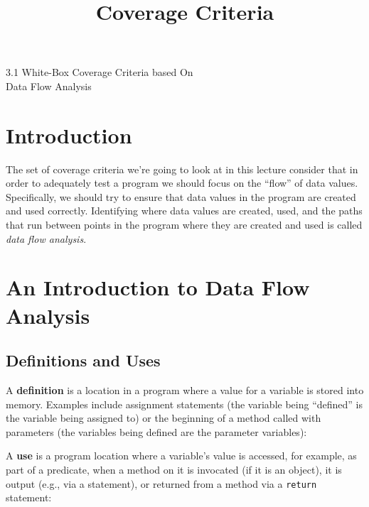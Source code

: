 



\title{Coverage Criteria}{3.1 White-Box Coverage Criteria based On \\ Data Flow Analysis}

\section{Introduction}

The set of coverage criteria we're going to look at in this lecture consider
that in order to adequately test a program we should focus on the ``flow'' of
data values. Specifically, we should try to ensure that data values in the
program are created and used correctly. Identifying where data values are
created, used, and the paths that run between points in the program where they
are created and used is called {\it data flow analysis}. 

\section{An Introduction to Data Flow Analysis}

\subsection{Definitions and Uses}

A {\bf definition} is a location in a program where a value for a variable is
stored into memory. Examples include assignment statements (the variable being
``defined'' is the variable being assigned to) or the beginning of a method called
with parameters (the variables being defined are the parameter variables):

\begin{center} 
\end{center}   

A {\bf use} is a program location where a variable's value is accessed, for
example, as part of a predicate, when a method on it is invocated (if it is an
object), it is output (e.g., via a  statement), or
returned from a method via a {\tt return} statement:

\begin{center} 
\end{center}  

